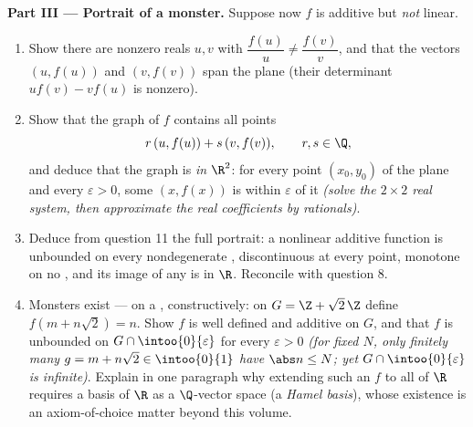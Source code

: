 \begin{problem}[{Weekend problem --- $f(x + y) = f(x) + f(y)$:
regularity forces linearity, and the portrait of the monsters}]
\medskip
\noindent\textbf{Part III --- Portrait of a monster.} Suppose
now $f$ is additive but \emph{not} linear.
\begin{enumerate}[resume]
  \item Show there are nonzero reals $u, v$ with
        $\dfrac{f(u)}{u} \neq \dfrac{f(v)}{v}$, and that the
        vectors $(u, f(u))$ and $(v, f(v))$ span the plane (their
        determinant $u f(v) - v f(u)$ is nonzero).
  \item Show that the graph of $f$ contains all points
        \[
        r\,(u, f(u)) + s\,(v, f(v)), \qquad r, s \in \Q ,
        \]
        and deduce that the graph is \emph{ in $\R^2$}: for
        every point $(x_0, y_0)$ of the plane and every
        $\varepsilon > 0$, some $(x, f(x))$ is within
        $\varepsilon$ of it \emph{(solve the $2\times2$ real
        system, then approximate the real coefficients by
        rationals)}.
  \item Deduce from question 11 the full portrait: a nonlinear
        additive function is unbounded on every nondegenerate
        , discontinuous at every point, monotone on no
        , and its image of any  is  in
        $\R$. Reconcile with question 8.
  \item Monsters exist --- on a  , constructively:
        on $G = \Z + \sqrt2\,\Z$ define $f(m + n\sqrt2) = n$.
        Show $f$ is well defined and additive on $G$, and that
        $f$ is unbounded on $G \cap \intoo{0}{\varepsilon}$ for
        every $\varepsilon > 0$ \emph{(for fixed $N$, only
        finitely many $g = m + n\sqrt2 \in \intoo{0}{1}$ have
        $\abs n \leq N$; yet $G \cap \intoo{0}{\varepsilon}$ is
        infinite)}. Explain in one paragraph why extending such
        an $f$ to all of $\R$ requires a basis of $\R$ as a
        $\Q$-vector space (a \emph{Hamel basis}), whose
        existence is an axiom-of-choice matter beyond this
        volume.
\end{enumerate}


\end{problem}
